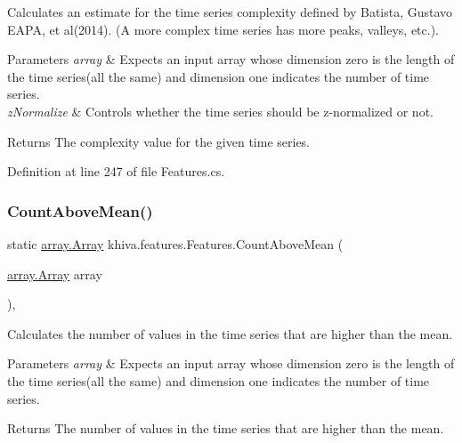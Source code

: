 Calculates an estimate for the time series complexity defined by Batista, Gustavo E\+A\+PA, et al(2014). (A more complex time series has more peaks, valleys, etc.). 


\begin{DoxyParams}{Parameters}
{\em array} & Expects an input array whose dimension zero is the length of the time series(all the same) and dimension one indicates the number of time series.\\
\hline
{\em z\+Normalize} & Controls whether the time series should be z-\/normalized or not.\\
\hline
\end{DoxyParams}
\begin{DoxyReturn}{Returns}
The complexity value for the given time series.
\end{DoxyReturn}


Definition at line 247 of file Features.\+cs.

\mbox{\label{classkhiva_1_1features_1_1_features_aebdccf7a2d77f12e1b8869e24369d231}} 
\subsubsection{\texorpdfstring{Count\+Above\+Mean()}{CountAboveMean()}}
{\footnotesize\ttfamily static \mbox{\hyperlink{classkhiva_1_1array_1_1_array}{array.\+Array}} khiva.\+features.\+Features.\+Count\+Above\+Mean (\begin{DoxyParamCaption}\item[{\mbox{\hyperlink{classkhiva_1_1array_1_1_array}{array.\+Array}}}]{array }\end{DoxyParamCaption})\hspace{0.3cm}{\ttfamily [inline]}, {\ttfamily [static]}}



Calculates the number of values in the time series that are higher than the mean. 


\begin{DoxyParams}{Parameters}
{\em array} & Expects an input array whose dimension zero is the length of the time series(all the same) and dimension one indicates the number of time series.\\
\hline
\end{DoxyParams}
\begin{DoxyReturn}{Returns}
The number of values in the time series that are higher than the mean.
\end{DoxyReturn}


